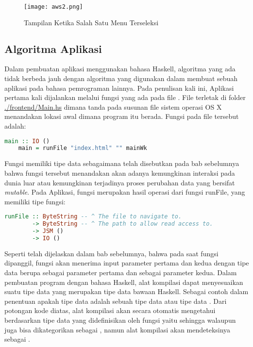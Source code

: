 \documentclass[pi.tex]{subfile}
\begin{document}
    \begin{figure}[H]
      \centering
  \texttt{[image: aws2.png]}\\
  \caption[Tampilan Seleksi Menu]{Tampilan Ketika Salah Satu Menu Terseleksi}
    \end{figure}


\subsection{Algoritma Aplikasi}\hspace{5pt}
Dalam pembuatan aplikasi menggunakan bahasa Haskell, algoritma yang ada tidak berbeda jauh dengan algoritma yang digunakan dalam membuat sebuah aplikasi pada bahasa pemrograman lainnya. Pada penulisan kali ini, Aplikasi pertama kali dijalankan melalui fungsi  yang ada pada file . File  terletak di folder \url{./frontend/Main.hs} dimana tanda  pada susunan file sistem operasi OS X menandakan lokasi awal dimana program itu berada. Fungsi  pada file tersebut adalah:\\

  \begin{lstlisting}[language=Haskell]
    main :: IO ()
    main = runFile "index.html" "" mainWk
  \end{lstlisting}

  \hspace{5pt}Fungsi  memiliki tipe data  sebagaimana telah disebutkan pada bab sebelumnya bahwa fungsi tersebut menandakan akan adanya kemungkinan interaksi pada dunia luar atau kemungkinan terjadinya proses perubahan data yang bersifat \emph{mutable}. Pada Aplikasi, fungsi  merupakan hasil operasi dari fungsi runFile, yang memiliki tipe fungsi:\\

    \begin{lstlisting}[language=Haskell]
  runFile :: ByteString -- ^ The file to navigate to.
        -> ByteString -- ^ The path to allow read access to.
        -> JSM ()
        -> IO ()
    \end{lstlisting}

    \hspace{5pt}Seperti telah dijelaskan dalam bab sebelumnya, bahwa pada saat fungsi  dipanggil, fungsi  akan menerima input parameter pertama dan kedua dengan tipe data  berupa  sebagai parameter pertama dan  sebagai parameter kedua. Dalam pembuatan program dengan bahasa Haskell, alat kompilasi dapat menyesuaikan suatu tipe data yang merupakan tipe data bawaan Haskell. Sebagai contoh dalam penentuan apakah tipe data  adalah sebuah tipe data  atau tipe data . Dari potongan kode diatas, alat kompilasi akan secara otomatis mengetahui berdasarkan tipe data yang didefinisikan oleh fungsi  yaitu  sehingga walaupun  juga bisa dikategorikan sebagai , namun alat kompilasi akan mendeteksinya sebagai .
\end{document}
